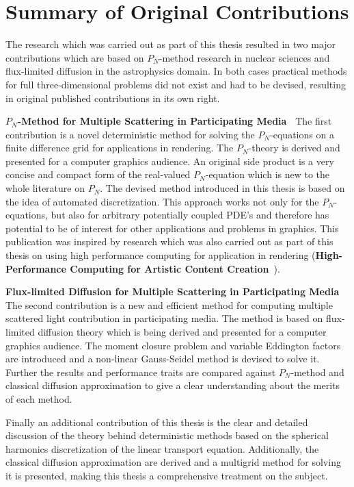 \section{Summary of Original Contributions}

The research which was carried out as part of this thesis resulted in two major contributions which are based on $P_N$-method research in nuclear sciences and flux-limited diffusion in the astrophysics domain. In both cases practical methods for full three-dimensional problems did not exist and had to be devised, resulting in original published contributions in its own right.

\textbf{$P_N$-Method for Multiple Scattering in Participating Media~\cite{Koerner18}} The first contribution is a novel deterministic method for solving the $P_N$-equations on a finite difference grid for applications in rendering. The $P_N$-theory is derived and presented for a computer graphics audience. An original side product is a very concise and compact form of the real-valued $P_N$-equation which is new to the whole literature on $P_N$. The devised method introduced in this thesis is based on the idea of automated discretization. This approach works not only for the $P_N$-equations, but also for arbitrary potentially coupled PDE's and therefore has potential to be of interest for other applications and problems in graphics. This publication was inspired by research which was also carried out as part of this thesis on using high performance computing for application in rendering (\textbf{High-Performance Computing for Artistic Content Creation}~\cite{Koerner17}).

\textbf{Flux-limited Diffusion for Multiple Scattering in Participating Media~\cite{Koerner14}} The second contribution is a new and efficient method for computing multiple scattered light contribution in participating media. The method is based on flux-limited diffusion theory which is being derived and presented for a computer graphics audience. The moment closure problem and variable Eddington factors are introduced and a non-linear Gauss-Seidel method is devised to solve it. Further the results and performance traits are compared against $P_N$-method and classical diffusion approximation to give a clear understanding about the merits of each method.

Finally an additional contribution of this thesis is the clear and detailed discussion of the theory behind deterministic methods based on the spherical harmonics discretization of the linear transport equation. Additionally, the classical diffusion approximation are derived and a multigrid method for solving it is presented, making this thesis a comprehensive treatment on the subject.

